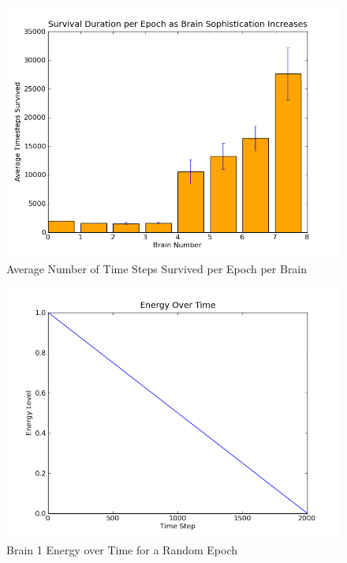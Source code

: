\documentclass[a4paper,11pt]{article}
\begin{document}
\begin{figure}
\begin{center}
  \includegraphics[scale=1.0]{img/survivalBar-0.11-0.11-227.69-154.23-2125.55-2254.41-2138.59-4506.76.png}
  \caption{Average Number of Time Steps Survived per Epoch per Brain}
  \label{fig:survivalbar}
\end{center}
\end{figure}













\begin{figure}
\begin{center}
  \includegraphics[scale=1.0]{img/brain1/1353130043-0.250000-EvT.png}
  \caption{Brain 1 Energy over Time for a Random Epoch}
  \label{fig:b1evt}
\end{center}
\end{figure}
\end{document}
